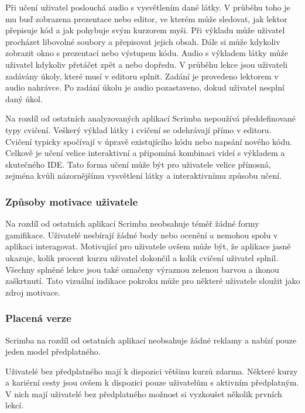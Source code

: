 Při učení uživatel poslouchá audio s vysvětlením dané látky. V průběhu toho je mu buď zobrazena prezentace nebo editor, ve kterém může sledovat, jak lektor přepisuje kód a jak pohybuje svým kurzorem myši. Při výkladu může uživatel procházet libovolné soubory a přepisovat jejich obsah. Dále si může kdykoliv zobrazit okno s prezentací nebo výstupem kódu. Audio s výkladem látky může uživatel kdykoliv přetáčet zpět a nebo dopředu. V průběhu lekce jsou uživateli zadávány úkoly, které musí v editoru splnit. Zadání je provedeno lektorem v audio nahrávce. Po zadání úkolu je audio pozastaveno, dokud uživatel nesplní daný úkol. 

Na rozdíl od ostatních analyzovaných aplikací Scrimba nepoužívá předdefinované typy cvičení. Veškerý výklad látky i cvičení se odehrávají přímo v editoru. Cvičení typicky spočívají v úpravě existujícího kódu nebo napsání nového kódu. Celkově je učení velice interaktivní a připomíná kombinaci videí s výkladem a skutečného IDE. Tato forma učení může být pro uživatele velice přínosná, zejména kvůli názornějšímu vysvětlení látky a interaktivnímu způsobu učení.

\subsubsection{Způsoby motivace uživatele}

Na rozdíl od ostatních aplikací Scrimba neobsahuje téměř žádné formy gamifikace. Uživatelé nesbírají žádné body nebo ocenění a nemohou spolu v aplikaci interagovat. Motivující pro uživatele ovšem může být, že aplikace jasně ukazuje, kolik procent kurzu uživatel dokončil a kolik cvičení uživatel splnil. Všechny splněné lekce jsou také označeny výraznou zelenou barvou a ikonou zaškrtnutí. Tato vizuální indikace pokroku může pro některé uživatele sloužit jako zdroj motivace.

\subsubsection{Placená verze}

Scrimba na rozdíl od ostatních aplikací neobsahuje žádné reklamy a nabízí pouze jeden model předplatného.

Uživatelé bez předplatného mají k dispozici většinu kurzů zdarma. Některé kurzy a kariérní cesty jsou ovšem k dispozici pouze uživatelům s aktivním předplatným. V nich mají uživatelé bez předplatného možnost si vyzkoušet několik prvních lekcí.


